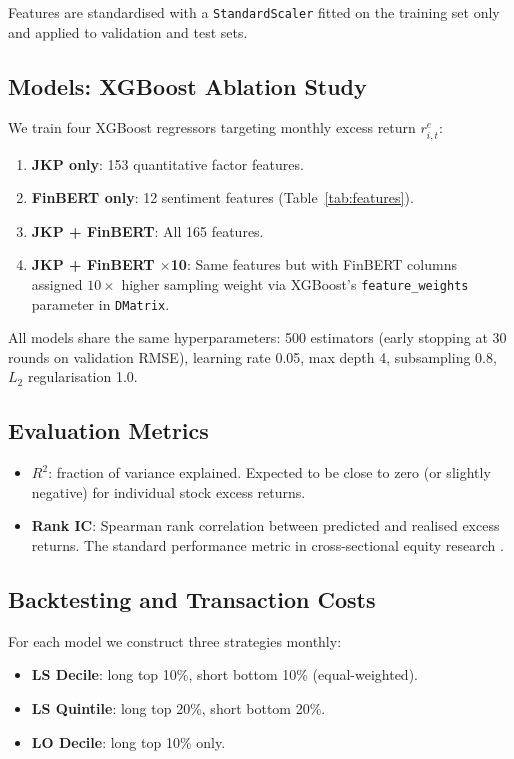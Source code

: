 \documentclass[11pt, a4paper]{article}
\begin{document}
Features are standardised with a \texttt{StandardScaler} fitted on the training
set only and applied to validation and test sets.

\subsection{Models: XGBoost Ablation Study}

We train four XGBoost regressors targeting monthly excess return $r^e_{i,t}$:

\begin{enumerate}[noitemsep]
    \item \textbf{JKP only}: 153 quantitative factor features.
    \item \textbf{FinBERT only}: 12 sentiment features (Table~\ref{tab:features}).
    \item \textbf{JKP + FinBERT}: All 165 features.
    \item \textbf{JKP + FinBERT $\times$10}: Same features but with FinBERT columns
          assigned $10\times$ higher sampling weight via XGBoost's
          \texttt{feature\_weights} parameter in \texttt{DMatrix}.
\end{enumerate}

All models share the same hyperparameters: 500 estimators (early stopping at
30 rounds on validation RMSE), learning rate 0.05, max depth 4,
subsampling 0.8, $L_2$ regularisation 1.0.

\subsection{Evaluation Metrics}

\begin{itemize}[noitemsep]
    \item \textbf{$R^2$}: fraction of variance explained. Expected to be close to
          zero (or slightly negative) for individual stock excess returns.
    \item \textbf{Rank IC}: Spearman rank correlation between predicted and realised
          excess returns. The standard performance metric in cross-sectional equity
          research \citep{grinold1999}.
\end{itemize}

\subsection{Backtesting and Transaction Costs}

For each model we construct three strategies monthly:
\begin{itemize}[noitemsep]
    \item \textbf{LS Decile}: long top 10\%, short bottom 10\% (equal-weighted).
    \item \textbf{LS Quintile}: long top 20\%, short bottom 20\%.
    \item \textbf{LO Decile}: long top 10\% only.
\end{itemize}
\end{document}
